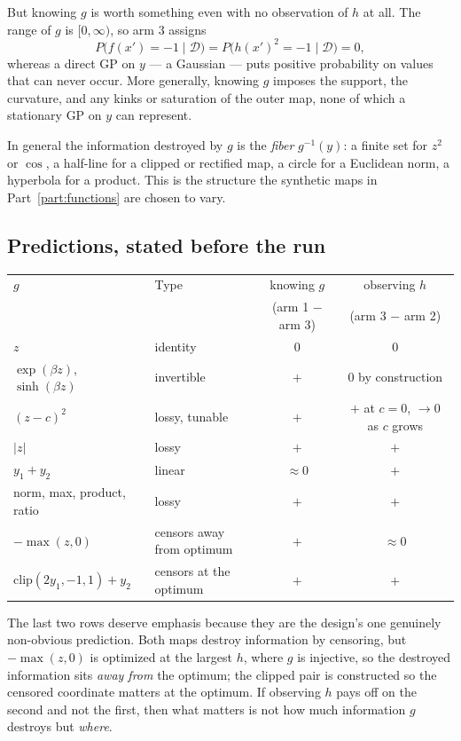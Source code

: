 \documentclass[11pt]{article}
\newcommand{\Data}{\mathcal{D}}
\begin{document}
But knowing $g$ is worth something even with no observation of $h$ at all. The
range of $g$ is $[0,\infty)$, so arm 3 assigns
\begin{equation}
P\bigl(f(x')=-1\mid\Data\bigr)=P\bigl(h(x')^2=-1\mid\Data\bigr)=0,
\end{equation}
whereas a direct GP on $y$ --- a Gaussian --- puts positive probability on values
that can never occur. More generally, knowing $g$ imposes the support, the
curvature, and any kinks or saturation of the outer map, none of which a
stationary GP on $y$ can represent.

In general the information destroyed by $g$ is the \emph{fiber} $g^{-1}(y)$: a
finite set for $z^2$ or $\cos$, a half-line for a clipped or rectified map, a
circle for a Euclidean norm, a hyperbola for a product. This is the structure
the synthetic maps in Part~\ref{part:functions} are chosen to vary.

\subsection{Predictions, stated before the run}

\begin{center}
\begin{tabular}{llcc}
\toprule
$g$ & Type & knowing $g$ & observing $h$ \\
& & (arm 1 $-$ arm 3) & (arm 3 $-$ arm 2) \\
\midrule
$z$                               & identity       & $0$ & $0$ \\
$\exp(\beta z)$, $\sinh(\beta z)$ & invertible     & $+$ & $0$ by construction \\
$(z-c)^2$                         & lossy, tunable & $+$ & $+$ at $c=0$, $\to0$ as $c$ grows \\
$|z|$                             & lossy          & $+$ & $+$ \\
$y_1+y_2$                         & linear         & $\approx0$ & $+$ \\
norm, max, product, ratio         & lossy          & $+$ & $+$ \\
$-\max(z,0)$                      & censors away from optimum & $+$ & $\approx 0$ \\
$\mathrm{clip}(2y_1,-1,1)+y_2$    & censors at the optimum & $+$ & $+$ \\
\bottomrule
\end{tabular}
\end{center}

The last two rows deserve emphasis because they are the design's one genuinely
non-obvious prediction. Both maps destroy information by censoring, but
$-\max(z,0)$ is optimized at the largest $h$, where $g$ is injective, so the
destroyed information sits \emph{away from} the optimum; the clipped pair is
constructed so the censored coordinate matters at the optimum. If observing $h$
pays off on the second and not the first, then what matters is not how much
information $g$ destroys but \emph{where}.
\end{document}
